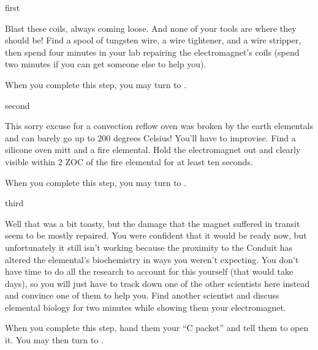 \documentclass[notebook]{elementals}
\begin{document}

\startnotebook{\nElectromagnet{}}

\begin{page}{first}

Blast these coils, always coming loose. And none of your tools are where they should be! Find a spool of tungsten wire, a wire tightener, and a wire stripper, then spend four minutes in your lab repairing the electromagnet's coils (spend two minutes if you can get someone else to help you).

When you complete this step, you may turn to .

\end{page}

\begin{page}{second}

This sorry excuse for a convection reflow oven was broken by the earth elementals and can barely go up to 200 degrees Celsius! You'll have to improvise. Find a silicone oven mitt and a fire elemental. Hold the electromagnet out and clearly visible within 2 ZOC of the fire elemental for at least ten seconds.

When you complete this step, you may turn to .

\end{page}

\begin{page}{third}

Well that was a bit toasty, but the damage that the magnet suffered in transit seem to be mostly repaired. You were confident that it would be ready now, but unfortunately it still isn't working because the proximity to the Conduit has altered the elemental's biochemistry in ways you weren't expecting. You don't have time to do all the research to account for this yourself (that would take days), so you will just have to track down one of the other scientists here instead and convince one of them to help you. Find another scientist and discuss elemental biology for two minutes while showing them your electromagnet.

When you complete this step, hand them your ``C packet'' and tell them to open it. You may then turn to .

\end{page}
\end{document}
